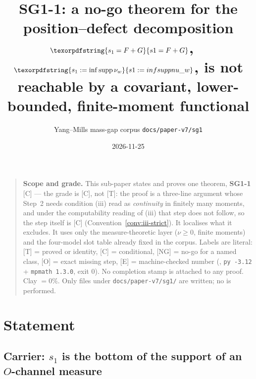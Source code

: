 \documentclass[11pt]{article}
\theoremstyle{definition}
\theoremstyle{remark}
\newcommand{\code}[1]{\texttt{\footnotesize\detokenize{#1}}}
\newcommand{\grT}{\textsf{[T]}}
\newcommand{\grC}{\textsf{[C]}}
\newcommand{\grN}{\textsf{[NG]}}
\newcommand{\grO}{\textsf{[O]}}
\newcommand{\grE}{\textsf{[E]}}
\begin{document}
\title{\textbf{SG1-1}: a no-go theorem for the position--defect decomposition\\[3pt]
\large $\texorpdfstring{s_1=F+G}{s1=F+G}$, \
$\texorpdfstring{s_1:=\inf\operatorname{supp}\nu_w}{s1 := inf supp nu\_w}$, is not
reachable by a covariant, lower-bounded, finite-moment functional}
\author{Yang--Mills mass-gap corpus \quad \texttt{docs/paper-v7/sg1}}
\date{2026-11-25}
\maketitle

\vspace{-1.0em}
\begin{quote}\small
\textbf{Scope and grade.} This sub-paper states and proves one theorem,
\textbf{SG1-1} \grC{} --- the grade is \grC{}, not \grT: the proof is a
three-line argument whose Step~2 needs condition (iii) read as
\emph{continuity} in finitely many moments, and under the computability
reading of (iii) that step does not follow, so the step itself is \grC{}
(Convention~\ref{conv:iii-strict}). It localises what it excludes. It uses
only the measure-theoretic layer ($\nu\ge 0$, finite moments) and the
four-model slot table already fixed in the corpus. Labels are literal: \grT{}
= proved or identity, \grC{} = conditional, \grN{} = no-go for a named class,
\grO{} = exact missing step, \grE{} = machine-checked number
(\code{w7/sg1_G.log}, \texttt{py -3.12} + \texttt{mpmath 1.3.0}, exit $0$).
No completion stamp is attached to any proof. Clay $=0\%$. Only files under
\texttt{docs/paper-v7/sg1/} are written; no \code{git commit} is performed.
\end{quote}

\section[Statement]{Statement}\label{sec:statement}

\subsection[Carrier]{Carrier: $s_1$ is the bottom of the support of an $O$-channel measure}
\end{document}

